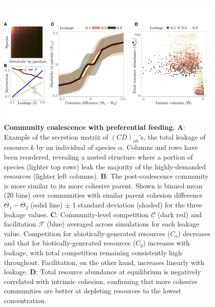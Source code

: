 \documentclass[10pt,letterpaper]{article}
\begin{document}
\begin{figure}[t]
\begin{adjustwidth}{-1.5in}{0in}
    \centering \includegraphics[width=1.3\columnwidth]{images/figure_3_compiled.pdf}
    \caption{\textbf{Community coalescence with preferential feeding.} {\bf A}: Example of the secretion matrix of $(C D)_{\alpha k}$'s, the total leakage of resource $k$ by an individual of species $\alpha$. Columns and rows have been reordered, revealing a nested structure where a portion of species (lighter top rows) leak the majority of the highly-demanded resources (lighter left columns). {\bf B}: The post-coalescence community is more similar to its more cohesive parent. Shown is binned mean (20 bins) over communities with similar parent cohesion difference $\Theta_1  - \Theta_2$ (solid line) $\pm$ 1 standard deviation (shaded) for the three leakage values. {\bf C}: Community-level competition $\mathcal{C}$ (dark red) and facilitation $\mathcal{F}$ (blue) averaged across simulations for each leakage value. Competition for abiotically-generated resources ($C_a$) decreases and that for biotically-generated resources ($C_b$) increases with leakage, with total competition remaining consistently high throughout. Facilitation, on the other hand, increases linearly with leakage. {\bf D}: Total resource abundance at equilibrium is negatively correlated with intrinsic cohesion, confirming that more cohesive communities are better at depleting resources to the lowest concentration.}
    \label{fig:assumption1}
\end{adjustwidth}
\end{figure}
\end{document}
